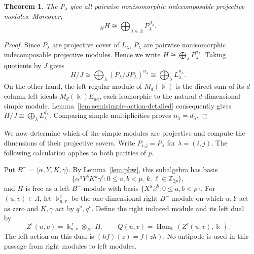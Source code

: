 \documentclass[10pt,oneside]{amsart}
\newcommand{\kk}{\Bbbk}
\newcommand{\Z}{\mathbb Z}
\newtheorem{theorem}[proposition]{Theorem}
\theoremstyle{definition}
\begin{document}
\begin{theorem}\label{thm:projective-covers}
The $P_\lambda$ give all pairwise nonisomorphic indecomposable projective
modules. Moreover,
\begin{equation}\label{eq:regular-projective-decomposition}
 {}_HH\cong\bigoplus_{\lambda\in\Lambda}P_\lambda^{\,d_\lambda}.
\end{equation}
\end{theorem}
\begin{proof}
Since $P_{\lambda}$ are projective cover of $L_{\lambda}$, $P_{\lambda}$ are pairwise nonisomorphic indecomposable projective modules.  Hence we write
$H\cong\bigoplus_\lambda P_\lambda^{n_\lambda}$.
Taking quotients by $J$ gives
\[
 H/J\cong\bigoplus_\lambda(P_\lambda/JP_\lambda)^{n_\lambda}
      \cong\bigoplus_\lambda L_\lambda^{n_\lambda}.
\]
On the other hand, the left regular module of $M_d(\kk)$ is the
direct sum of its $d$ column left ideals $M_d(\kk)E_{aa}$, each
isomorphic to the natural $d$-dimensional simple module.
Lemma~\ref{lem:semisimple-action-detailed} consequently gives
$H/J\cong\bigoplus_\lambda L_\lambda^{d_\lambda}$.
Comparing simple multiplicities proves $n_\lambda=d_\lambda$.
\end{proof}




We now determine which of the simple modules are projective and compute
the dimensions of their projective covers. Write $P_{i,j}=P_\lambda$
for $\lambda=(i,j)$. The following calculation applies to both parities
of $p$.

Put $B^-=\langle\alpha,Y,K,\gamma\rangle$. By
Lemma~\ref{lem:pbw}, this subalgebra has basis
\[
 \{\alpha^aY^bK^k\gamma^\ell:
       0\le a,b<p,\ k,\ell\in\Z_{2p}\},
\]
and $H$ is free as a left $B^-$-module with basis
$\{X^a\beta^b:0\le a,b<p\}$. For $(u,v)\in\Lambda$, let
$\kk_{u,v}^{\,\mathrm r}$ be the one-dimensional right $B^-$-module
on which $\alpha,Y$ act as zero and $K,\gamma$ act by $q^u,q^v$.
Define the right induced module and its left dual by
\[
 Z^{\mathrm r}(u,v)=\kk_{u,v}^{\,\mathrm r}\otimes_{B^-}H,
 \qquad Q(u,v)=\operatorname{Hom}_{\kk}(Z^{\mathrm r}(u,v),\kk).
\]
The left action on this dual is $(hf)(z)=f(zh)$. No antipode is
used in this passage from right modules to left modules.
\end{document}
